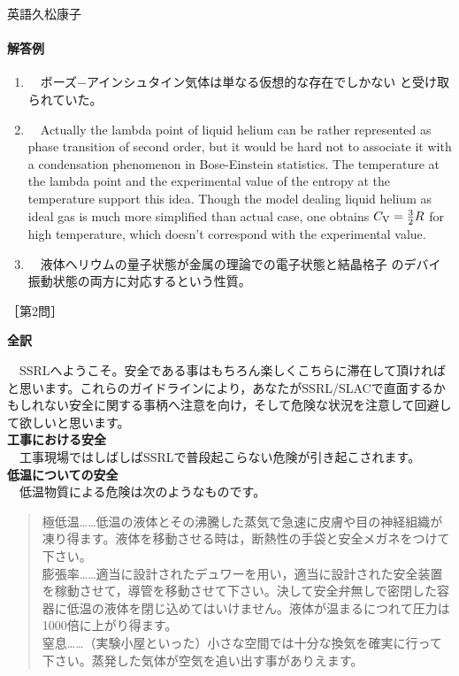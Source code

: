 \documentclass[fleqn]{jbook}
\def\V{{\rm V}}
\begin{document}
\begin{answer}{英語}{久松康子}
\paragraph{解答例}

\begin{enumerate}

\item 　ボーズ−アインシュタイン気体は単なる仮想的な存在でしかない
と受け取られていた。\\

\item 　Actually the lambda point of liquid helium can be rather 
represented as phase transition of second order, but it would be
hard not to associate it with a condensation phenomenon in 
Bose-Einstein statistics.  The temperature at the lambda point 
and the experimental value of the entropy at the temperature support
this idea.  Though the model dealing liquid helium as ideal gas 
is much more simplified than actual case, one obtains 
$C_\V=\frac{3}{2}R$ for high temperature, which doesn't correspond
with the experimental value.\\
 
\item 　液体ヘリウムの量子状態が金属の理論での電子状態と結晶格子
のデバイ振動状態の両方に対応するという性質。\\

\end{enumerate}

\newpage


［第2問］

\textbf{全訳}

　SSRLへようこそ。安全である事はもちろん楽しくこちらに滞在して頂ければと思います。これらのガイドラインにより，あなたがSSRL/SLACで直面するかもしれない安全に関する事柄へ注意を向け，そして危険な状況を注意して回避して欲しいと思います。\\

{\bf 工事における安全}\\
　工事現場ではしばしばSSRLで普段起こらない危険が引き起こされます。\\

{\bf 低温についての安全}\\
　低温物質による危険は次のようなものです。
\begin{quote}
極低温……低温の液体とその沸騰した蒸気で急速に皮膚や目の神経組織が凍り得ます。液体を移動させる時は，断熱性の手袋と安全メガネをつけて下さい。\\
膨張率……適当に設計されたデュワーを用い，適当に設計された安全装置を稼動させて，導管を移動させて下さい。決して安全弁無しで密閉した容器に低温の液体を閉じ込めてはいけません。液体が温まるにつれて圧力は1000倍に上がり得ます。 \\
窒息……（実験小屋といった）小さな空間では十分な換気を確実に行って下さい。蒸発した気体が空気を追い出す事がありえます。
\end{quote}


\end{answer}
\end{document}
